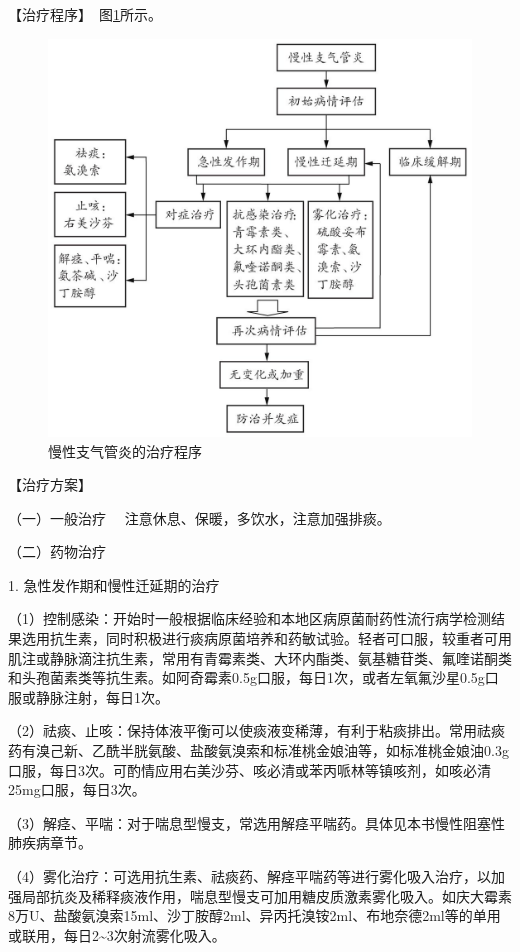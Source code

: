 【治疗程序】　图\ref{fig1-3-1}所示。

\begin{figure}[!htbp]
 \centering
 \includegraphics{./images/Image00002.jpg}
 \captionsetup{justification=centering}
 \caption{慢性支气管炎的治疗程序}
 \label{fig1-3-1}
  \end{figure} 

【治疗方案】

{（一）一般治疗} 　注意休息、保暖，多饮水，注意加强排痰。

{（二）药物治疗}

1. 急性发作期和慢性迁延期的治疗

（1）控制感染：开始时一般根据临床经验和本地区病原菌耐药性流行病学检测结果选用抗生素，同时积极进行痰病原菌培养和药敏试验。轻者可口服，较重者可用肌注或静脉滴注抗生素，常用有青霉素类、大环内酯类、氨基糖苷类、氟喹诺酮类和头孢菌素类等抗生素。如阿奇霉素0.5g口服，每日1次，或者左氧氟沙星0.5g口服或静脉注射，每日1次。

（2）祛痰、止咳：保持体液平衡可以使痰液变稀薄，有利于粘痰排出。常用祛痰药有溴己新、乙酰半胱氨酸、盐酸氨溴索和标准桃金娘油等，如标准桃金娘油0.3g口服，每日3次。可酌情应用右美沙芬、咳必清或苯丙哌林等镇咳剂，如咳必清25mg口服，每日3次。

（3）解痉、平喘：对于喘息型慢支，常选用解痉平喘药。具体见本书慢性阻塞性肺疾病章节。

（4）雾化治疗：可选用抗生素、祛痰药、解痉平喘药等进行雾化吸入治疗，以加强局部抗炎及稀释痰液作用，喘息型慢支可加用糖皮质激素雾化吸入。如庆大霉素8万U、盐酸氨溴索15ml、沙丁胺醇2ml、异丙托溴铵2ml、布地奈德2ml等的单用或联用，每日2\textasciitilde{}3次射流雾化吸入。

